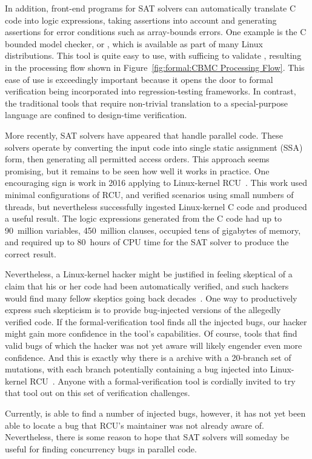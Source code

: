 In addition, front-end programs for SAT solvers can automatically translate
C code into logic expressions, taking assertions into account and generating
assertions for error conditions such as array-bounds errors.
One example is the C bounded model checker, or , which is
available as part of many Linux distributions.
This tool is quite easy to use, with  sufficing to
validate , resulting in the processing flow shown in
Figure~\ref{fig:formal:CBMC Processing Flow}.
This ease of use is exceedingly important because it opens the door
to formal verification being incorporated into regression-testing
frameworks.
In contrast, the traditional tools that require non-trivial translation
to a special-purpose language are confined to design-time verification.

More recently, SAT solvers have appeared that handle parallel code.
These solvers operate by converting the input code into single static
assignment (SSA) form, then generating all permitted access orders.
This approach seems promising, but it remains to be seen how well
it works in practice.
One encouraging sign is work in 2016 applying  to Linux-kernel
RCU~\cite{LihaoLiang2016VerifyTreeRCU,Liang:2018:VTB,LanceRoy2017CBMC-SRCU}.
This work used minimal configurations of RCU, and verified scenarios
using small numbers of threads, but nevertheless successfully ingested
Linux-kernel C code and produced a useful result.
The logic expressions generated from the C code had up to 90~million
variables, 450~million clauses, occupied tens of gigabytes of memory,
and required up to 80~hours of CPU time for the SAT solver to produce
the correct result.

Nevertheless, a Linux-kernel hacker might be justified in feeling skeptical
of a claim that his or her code had been automatically verified, and
such hackers would find many fellow skeptics going back
decades~\cite{DeMillo:1979:SPP:359104.359106}.
One way to productively express such skepticism is to provide bug-injected
versions of the allegedly verified code.
If the formal-verification tool finds all the injected bugs, our hacker
might gain more confidence in the tool's capabilities.
Of course, tools that find valid bugs of which the hacker was not yet aware
will likely engender even more confidence.
And this is exactly why there is a  archive with a 20-branch set
of mutations, with each branch potentially containing a bug injected
into Linux-kernel RCU~\cite{PaulEMcKenney2017VerificationChallenge6}.
Anyone with a formal-verification tool is cordially invited to try that
tool out on this set of verification challenges.

Currently,  is able to find a number of injected bugs,
however, it has not yet been able to locate a bug that RCU's
maintainer was not already aware of.
Nevertheless, there is some reason to hope that SAT solvers will someday
be useful for finding concurrency bugs in parallel code.

